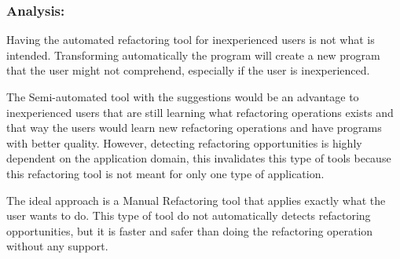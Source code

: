 

\subsubsection{Analysis:}
Having the automated refactoring tool for inexperienced users is not what is intended. 
Transforming automatically the program will create a new program that the user might not comprehend, especially if the user is inexperienced.

The Semi-automated tool with the suggestions would be an advantage to inexperienced users that are still learning what refactoring operations exists and that way the users would learn new refactoring operations and have programs with better quality.
However, detecting refactoring opportunities is highly dependent on the application domain, this invalidates this type of tools because this refactoring tool is not meant for only one type of application.

The ideal approach is a Manual Refactoring tool that applies exactly what the user wants to do. 
This type of tool do not automatically detects refactoring opportunities, but it is faster and safer than doing the refactoring operation without any support.